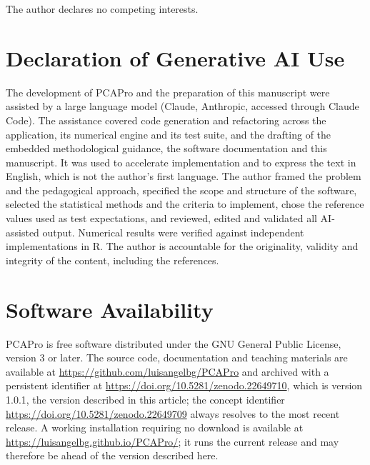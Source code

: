 \documentclass[12pt]{article}
\begin{document}
The author declares no competing interests.

\section*{Declaration of Generative AI Use}

The development of PCAPro and the preparation of this manuscript were assisted
by a large language model (Claude, Anthropic, accessed through Claude Code).
The assistance covered code generation and refactoring across the application,
its numerical engine and its test suite, and the drafting of the embedded
methodological guidance, the software documentation and this manuscript. It was
used to accelerate implementation and to express the text in English, which is
not the author's first language. The author framed the problem and the
pedagogical approach, specified the scope and structure of the software,
selected the statistical methods and the criteria to implement, chose the
reference values used as test expectations, and reviewed, edited and validated
all AI-assisted output. Numerical results were verified against independent
implementations in R. The author is accountable for the originality, validity
and integrity of the content, including the references.

\section*{Software Availability}

PCAPro is free software distributed under the GNU General Public License,
version 3 or later. The source code, documentation and teaching materials are
available at \url{https://github.com/luisangelbg/PCAPro} and archived with a
persistent identifier at \url{https://doi.org/10.5281/zenodo.22649710}, which
is version 1.0.1, the version described in this article; the concept
identifier \url{https://doi.org/10.5281/zenodo.22649709} always resolves to
the most recent release. A working installation requiring no download is
available at \url{https://luisangelbg.github.io/PCAPro/}; it runs the current
release and may therefore be ahead of the version described here.

\end{document}
